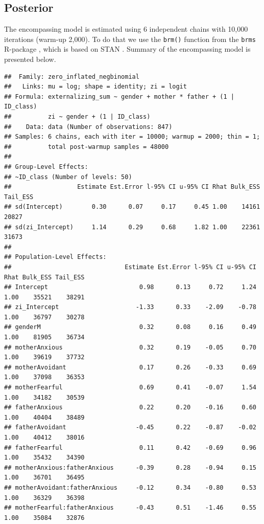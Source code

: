\documentclass[
]{book}
\begin{document}
\hypertarget{posterior}{%
\subsection{Posterior}\label{posterior}}

The encompassing model is estimated using 6 independent chains with 10,000 iterations (warm-up 2,000). To do that we use the \texttt{brm()} function from the \texttt{brms} R-package \citep{burknerBrmsPackageBayesian2017, burknerAdvancedBayesianMultilevel2018a}, which is based on STAN \citep{standevelopmentteamRStanInterfaceStan2020}. Summary of the encompassing model is presented below.

\begin{verbatim}
##  Family: zero_inflated_negbinomial 
##   Links: mu = log; shape = identity; zi = logit 
## Formula: externalizing_sum ~ gender + mother * father + (1 | ID_class) 
##          zi ~ gender + (1 | ID_class)
##    Data: data (Number of observations: 847) 
## Samples: 6 chains, each with iter = 10000; warmup = 2000; thin = 1;
##          total post-warmup samples = 48000
## 
## Group-Level Effects: 
## ~ID_class (Number of levels: 50) 
##                  Estimate Est.Error l-95% CI u-95% CI Rhat Bulk_ESS Tail_ESS
## sd(Intercept)        0.30      0.07     0.17     0.45 1.00    14161    20827
## sd(zi_Intercept)     1.14      0.29     0.68     1.82 1.00    22361    31673
## 
## Population-Level Effects: 
##                               Estimate Est.Error l-95% CI u-95% CI Rhat Bulk_ESS Tail_ESS
## Intercept                         0.98      0.13     0.72     1.24 1.00    35521    38291
## zi_Intercept                     -1.33      0.33    -2.09    -0.78 1.00    36797    30278
## genderM                           0.32      0.08     0.16     0.49 1.00    81905    36734
## motherAnxious                     0.32      0.19    -0.05     0.70 1.00    39619    37732
## motherAvoidant                    0.17      0.26    -0.33     0.69 1.00    37098    36353
## motherFearful                     0.69      0.41    -0.07     1.54 1.00    34182    30539
## fatherAnxious                     0.22      0.20    -0.16     0.60 1.00    40404    38489
## fatherAvoidant                   -0.45      0.22    -0.87    -0.02 1.00    40412    38016
## fatherFearful                     0.11      0.42    -0.69     0.96 1.00    35432    34390
## motherAnxious:fatherAnxious      -0.39      0.28    -0.94     0.15 1.00    36701    36495
## motherAvoidant:fatherAnxious     -0.12      0.34    -0.80     0.53 1.00    36329    36398
## motherFearful:fatherAnxious      -0.43      0.51    -1.46     0.55 1.00    35084    32876

\end{verbatim}
\end{document}
